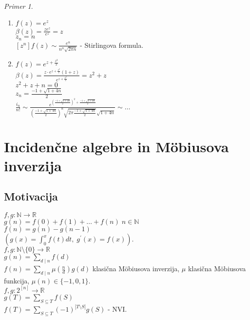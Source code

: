\documentclass[a4paper, 12pt]{book}
\theoremstyle{definition}
\theoremstyle{remark}
\newtheorem*{ex}{Primer}
\newcommand{\N}{\mathbb{N}}
\newcommand{\R}{\mathbb{R}}
\begin{document}
\begin{ex} \text{} \\
  \begin{enumerate}[label=(\arabic*)]
    \item $f(z) = e^z$ \\
      $\beta(z) = \frac{z e^z}{e^z} = z$ \\
      $z_n = n$ \\
      $[z^n] f(z) \sim \frac{e^n}{n^n \sqrt{2 \pi n}}$ - Stirlingova formula.
    \item $f(z) = e^{z + \frac{z^2}{2}}$ \\
      $\beta(z) = \frac{z \cdot e^{z + \frac{z^2}{2}} (1 + z)}{e^{z + \frac{z^2}{2}}} = z^2 + z$ \\
      $z^2 + z + n = 0$ \\
      $z_n = \frac{-1 + \sqrt{1 + 4n}}{2}$ \\
      $\frac{i_n}{n!} \sim \frac
        {e^{\left(\frac{-1 + \sqrt{1 + 4n}}{2}\right)^2 + \frac{-1 + \sqrt{1 + 4n}}{2}}}
        {\left(\frac{-1 + \sqrt{1 + 4n}}{2}\right)^n
        \sqrt{2 \pi \frac{-1 + \sqrt{1 + 4n}}{2}} \sqrt{1 + 4n}} \sim \dots$
  \end{enumerate}
\end{ex}



\chapter{Incidenčne algebre in Möbiusova inverzija}


\section{Motivacija}

$f, g: \N \to \R$ \\
$g(n) = f(0) + f(1) + \dots + f(n) \; n \in \N$ \\
$f(n) = g(n) - g(n-1)$ \\
$(g(x) = \int_{0}^{x} f(t) dt, \; g^{'}(x) = f(x))$. \\
$f, g: \N \setminus \{0\} \to \R$ \\
$g(n) = \sum_{d \mid n} f(d)$ \\
$f(n) = \sum_{d \mid n} \mu\left(\frac{n}{d}\right) g(d)$ klasična Möbiusova inverzija,
$\mu$ klasična Möbiusova funkcija, $\mu(n) \in \{-1, 0, 1\}$. \\
$f, g: 2^{[n]} \to \R$ \\
$g(T) = \sum_{S \subseteq T} f(S)$ \\
$f(T) = \sum_{S \subseteq T} (-1)^{|T \setminus S|} g(S)$ - NVI. \\
\end{document}
